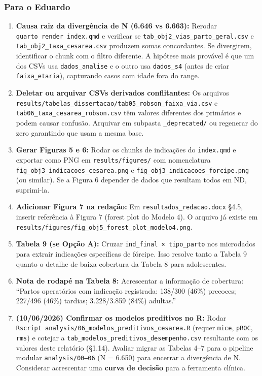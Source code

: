 \documentclass[
]{article}
\begin{document}
\hypertarget{para-o-eduardo}{%
\subsubsection{Para o Eduardo}\label{para-o-eduardo}}

\begin{enumerate}
\def\labelenumi{\arabic{enumi}.}
\item
  \textbf{Causa raiz da divergência de N (6.646 vs 6.663):} Rerodar
  \texttt{quarto\ render\ index.qmd} e verificar se
  \texttt{tab\_obj2\_vias\_parto\_geral.csv} e
  \texttt{tab\_obj2\_taxa\_cesarea.csv} produzem somas concordantes. Se
  divergirem, identificar o chunk com o filtro diferente. A hipótese
  mais provável é que um dos CSVs usa \texttt{dados\_analise} e o outro
  usa \texttt{dados\_s4} (antes de criar \texttt{faixa\_etaria}),
  capturando casos com idade fora do range.
\item
  \textbf{Deletar ou arquivar CSVs derivados conflitantes:} Os arquivos
  \texttt{results/tabelas\_dissertacao/tab05\_robson\_faixa\_via.csv} e
  \texttt{tab06\_taxa\_cesarea\_robson.csv} têm valores diferentes dos
  primários e podem causar confusão. Arquivar em subpasta
  \texttt{\_deprecated/} ou regenerar do zero garantindo que usam a
  mesma base.
\item
  \textbf{Gerar Figuras 5 e 6:} Rodar os chunks de indicações do
  \texttt{index.qmd} e exportar como PNG em \texttt{results/figures/}
  com nomenclatura \texttt{fig\_obj3\_indicacoes\_cesarea.png} e
  \texttt{fig\_obj3\_indicacoes\_forcipe.png} (ou similar). Se a Figura
  6 depender de dados que resultam todos em ND, suprimi-la.
\item
  \textbf{Adicionar Figura 7 na redação:} Em
  \texttt{resultados\_redacao.docx} §4.5, inserir referência à Figura 7
  (forest plot do Modelo 4). O arquivo já existe em
  \texttt{results/figures/fig\_obj5\_forest\_plot\_modelo4.png}.
\item
  \textbf{Tabela 9 (se Opção A):} Cruzar
  \texttt{ind\_final\ ×\ tipo\_parto} nos microdados para extrair
  indicações específicas de fórcipe. Isso resolve tanto a Tabela 9
  quanto o detalhe de baixa cobertura da Tabela 8 para adolescentes.
\item
  \textbf{Nota de rodapé na Tabela 8:} Acrescentar a informação de
  cobertura: ``Partos operatórios com indicação registrada: 138/300
  (46\%) precoces; 227/496 (46\%) tardias; 3.228/3.859 (84\%) adultas.''
\item
  \textbf{(10/06/2026) Confirmar os modelos preditivos no R:} Rodar
  \texttt{Rscript\ analysis/06\_modelos\_preditivos\_cesarea.R} (requer
  \texttt{mice}, \texttt{pROC}, \texttt{rms}) e cotejar a
  \texttt{tab\_modelos\_preditivos\_desempenho.csv} resultante com os
  valores deste relatório (§1.14). Avaliar migrar as Tabelas 4--7 para o
  pipeline modular \texttt{analysis/00–06} (N = 6.650) para encerrar a
  divergência de N. Considerar acrescentar uma \textbf{curva de decisão}
  para a ferramenta clínica.
\end{enumerate}
\end{document}
